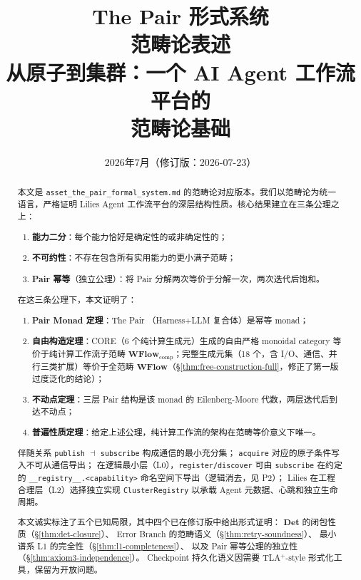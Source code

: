 \documentclass[11pt,a4paper]{article}
\title{
    {\Huge The Pair 形式系统} \\[0.3cm]
    {\large 范畴论表述} \\[0.5cm]
    {\normalsize 从原子到集群：一个 AI Agent 工作流平台的 \\
                   范畴论基础}
}
\author{
    \small 2026年7月\quad（修订版：2026-07-23）
}
\date{}
\theoremstyle{definition}
\theoremstyle{definition}
\theoremstyle{remark}
\newcommand{\cat}[1]{\mathbf{#1}}
\newcommand{\catWFlow}{\cat{WFlow}}
\newcommand{\catDet}{\cat{Det}}
\newcommand{\adjunction}{\dashv}
\begin{document}
\maketitle

\begin{abstract}
本文是 \texttt{asset\_the\_pair\_formal\_system.md} 的范畴论对应版本。我们以范畴论为统一语言，严格证明 Lilies Agent 工作流平台的深层结构性质。核心结果建立在三条公理之上：

\begin{enumerate}[leftmargin=2em,label=(\arabic*)]
    \item \textbf{能力二分}：每个能力恰好是确定性的或非确定性的；
    \item \textbf{不可约性}：不存在包含所有实用能力的更小满子范畴；
    \item \textbf{Pair 幂等}（独立公理）：将 Pair 分解两次等价于分解一次，两次迭代后饱和。
\end{enumerate}

在这三条公理下，本文证明了：
\begin{enumerate}[leftmargin=2em,label=(\arabic*)]
    \item \textbf{Pair Monad 定理}：The Pair （Harness+LLM 复合体）是幂等 monad；
    \item \textbf{自由构造定理}：CORE（6 个纯计算生成元）生成的自由严格 monoidal category 等价于纯计算工作流子范畴 $\catWFlow_{\mathrm{comp}}$；完整生成元集（18 个，含 I/O、通信、并行三类扩展）等价于全范畴 $\catWFlow$（\S\ref{thm:free-construction-full}，修正了第一版过度泛化的结论）；
    \item \textbf{不动点定理}：三层 Pair 结构是该 monad 的 Eilenberg-Moore 代数，两层迭代后到达不动点；
    \item \textbf{普遍性质定理}：给定上述公理，纯计算工作流的架构在范畴等价意义下唯一。
\end{enumerate}

伴随关系 \texttt{publish} $\adjunction$ \texttt{subscribe} 构成通信的最小充分集；
\texttt{acquire} 对应的原子条件写入不可从通信导出；
在逻辑最小层（L0），\texttt{register/discover} 可由 \texttt{subscribe} 在约定的 \texttt{\_\_registry\_\_.<capability>} 命名空间下导出（逻辑消去，见 P2）；
Lilies 在工程合理层（L2）选择独立实现 \texttt{ClusterRegistry} 以承载 Agent 元数据、心跳和独立生命周期。

本文诚实标注了五个已知局限，其中四个已在修订版中给出形式证明：
$\catDet$ 的闭包性质（\S\ref{thm:det-closure}）、
Error Branch 的范畴语义（\S\ref{thm:retry-soundness}）、
最小谱系 L1 的完全性（\S\ref{thm:l1-completeness}）、
以及 Pair 幂等公理的独立性（\S\ref{thm:axiom3-independence}）。
Checkpoint 持久化语义因需要 TLA$^{+}$-style 形式化工具，保留为开放问题。
\end{abstract}
\end{document}
